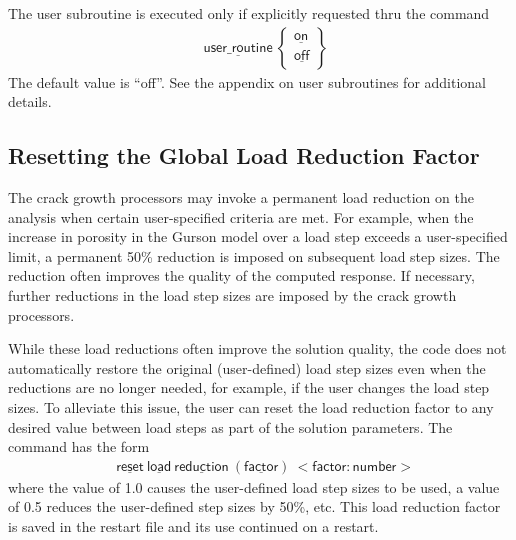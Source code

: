 \documentclass[11pt]{report}
\numberwithin{equation}{section}
\newcommand{\nin} {\noindent}
\newcommand{\ul} {\underline}
\newcommand{\hv} {\mathsf}   %
\begin{document}
The user subroutine is executed only if explicitly requested thru the
command
\begin{align*}
&\hv{\ul{user\_routine}\    }
\begin{Bmatrix}
\hv{\ul{on} }\\ \hv{\ul{off}}
\end{Bmatrix}
\end{align*}
\nin The default value is ``off''. See the appendix on user subroutines
for additional details.

\subsection{Resetting the Global Load Reduction Factor}
\nin The crack growth processors may invoke a permanent load reduction on the analysis 
when certain user-specified criteria are met. For example, when the increase in porosity in the 
Gurson model over a load step exceeds a user-specified limit, a permanent 50\% reduction 
is imposed on subsequent load step sizes. The reduction often improves the quality of the 
computed response. If necessary, further reductions in the load step sizes are imposed
by the crack growth processors.

While these load reductions often improve the solution quality, the code does not automatically 
restore the original (user-defined) load step sizes even when the reductions are no longer 
needed, for example, if the user changes the load step sizes. To alleviate this issue, 
the user can reset the load reduction factor to any desired value between load steps as part of 
the solution parameters. The command has the form
\begin{align*}
&\hv{\ul{reset}\  \ul{load}\  \ul{reduction}\  (\ul{factor})\  <factor:number>  }
\end{align*}
\nin where the value of 1.0 causes the user-defined load step sizes to be used, a value of 0.5 reduces the 
user-defined step sizes by 50\%, etc. This load reduction factor is saved in the restart file 
and its use continued on a restart.
\end{document}
